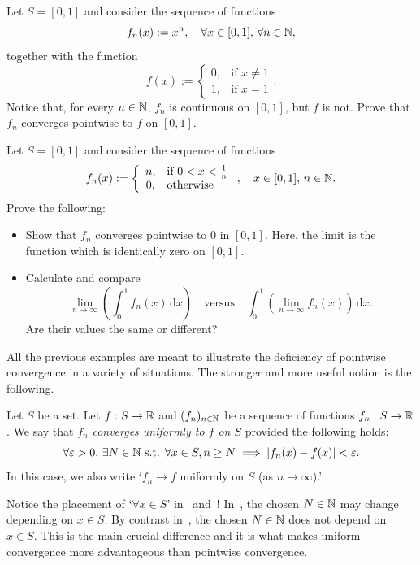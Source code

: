 \begin{ex}
	Let $S = [0,1]$ and consider the sequence of functions
	\[
	f_n(x) := x^n,\quad \forall x\in [0,1],\,\forall n\in\mathbb{N},
	\]
	together with the function
	\[
	f(x) :=\left\{
	\begin{array}{cl}
		0, 	&\text{if }x \neq 1 	\\
		1, 	&\text{if }x = 1
	\end{array}
	\right..
	\]
	Notice that, for every $n\in\mathbb{N}$, $f_n$ is continuous on $[0,1]$, but $f$ is not. Prove that $f_n$ converges pointwise to $f$ on $[0,1]$.
\end{ex}
\begin{ex}
	\label{ex:pt_int}
	Let $S = [0,1]$ and consider the sequence of functions
	\[
	f_n(x):= \left\{
	\begin{array}{cl}
		n, 	&\text{if }0 < x < \frac{1}{n} 	\\
		0, 	&\text{otherwise}
	\end{array}
	\right.,\quad x\in [0,1],\,n\in\mathbb{N}.
	\]
	Prove the following:
	\begin{itemize}
		\item Show that $f_n$ converges pointwise to $0$ in $[0,1]$. Here, the limit is the function which is identically zero on $[0,1]$.
		\item Calculate and compare
		\[
		\lim_{n\to \infty}\left(\int_0^1f_n(x)\,\mathrm{d}x\right)\quad\text{versus}\quad \int_0^1\left(\lim_{n\to\infty}f_n(x)\right)\,\mathrm{d}x.
		\]
		Are their values the same or different?
	\end{itemize}
\end{ex}
All the previous examples are meant to illustrate the deficiency of pointwise convergence in a variety of situations. The stronger and more useful notion is the following.
\begin{defn}
	\label{defn:unif_cvg}
	Let $S$ be a set. Let $f:S\to \mathbb{R}$ and $(f_n)_{n\in\mathbb{N}}$ be a sequence of functions $f_n:S\to \mathbb{R}$. We say that $f_n$ \textit{converges uniformly to $f$ on $S$} provided the following holds:
	\[
	\forall \varepsilon>0,\,\exists N\in\mathbb{N}\text{ s.t. }\forall x \in S, n\ge N \implies |f_n(x) - f(x)|<\varepsilon.
	\]
	In this case, we also write `$f_n\to f$ uniformly on $S$ (as $n\to \infty$).'
\end{defn}
Notice the placement of `$\forall x \in S$' in~ and~! In~, the chosen $N\in \mathbb{N}$ may change depending on $x\in S$. By contrast in~, the chosen $N\in\mathbb{N}$ does not depend on $x\in S$. This is the main crucial difference and it is what makes uniform convergence more advantageous than pointwise convergence.
